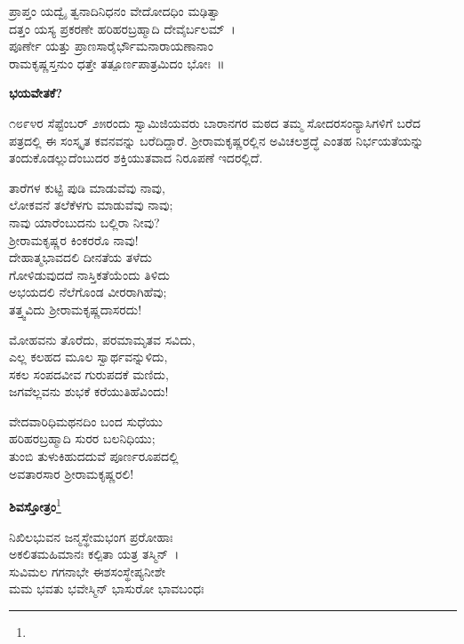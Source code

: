 \begin{myquote}
ಪ್ರಾಪ್ತಂ ಯದ್ವೈ ತ್ವನಾದಿನಿಧನಂ ವೇದೋದಧಿಂ ಮಢಿತ್ವಾ\\ದತ್ತಂ ಯಸ್ಯ ಪ್ರಕರಣೇ ಹರಿಹರಬ್ರಹ್ಮಾದಿ ದೇವೈರ್ಬಲಮ್~।\\
ಪೂರ್ಣೇ ಯತ್ತು ಪ್ರಾಣಸಾರೈರ್ಭೌಮನಾರಾಯಣಾನಾಂ\\ರಾಮಕೃಷ್ಣಸ್ತನುಂ ಧತ್ತೇ ತತ್ಪೂರ್ಣಪಾತ್ರಮಿದಂ ಭೋಃ~॥
\end{myquote}

\begin{center}
\textbf{ಭಯವೇತಕೆ?}
\end{center}

೧೮೯೪ರ ಸೆಪ್ಟೆಂಬರ್ ೨೫ರಂದು ಸ್ವಾಮಿಜಿಯವರು ಬಾರಾನಗರ ಮಠದ ತಮ್ಮ ಸೋದರಸಂನ್ಯಾಸಿಗಳಿಗೆ ಬರೆದ ಪತ್ರದಲ್ಲಿ ಈ ಸಂಸ್ಕೃತ ಕವನವನ್ನು ಬರೆದಿದ್ದಾರೆ. ಶ‍್ರೀರಾಮಕೃಷ್ಣರಲ್ಲಿನ ಅವಿಚಲಶ್ರದ್ಧೆ ಎಂತಹ ನಿರ್ಭಯತೆಯನ್ನು ತಂದುಕೊಡಲ್ಲುದೆಂಬುದರ ಶಕ್ತಿಯುತವಾದ ನಿರೂಪಣೆ ಇದರಲ್ಲಿದೆ.

\begin{myquote}
ತಾರೆಗಳ ಕುಟ್ಟಿ ಪುಡಿ ಮಾಡುವೆವು ನಾವು,\\ಲೋಕವನೆ ತಲೆಕೆಳಗು ಮಾಡುವೆವು ನಾವು;\\ನಾವು ಯಾರೆಂಬುದನು ಬಲ್ಲಿರಾ ನೀವು?\\ಶ‍್ರೀರಾಮಕೃಷ್ಣರ ಕಿಂಕರರೊ ನಾವು!\\ದೇಹಾತ್ಮಭಾವದಲಿ ದೀನತೆಯ ತಳೆದು\\ಗೋಳಿಡುವುದದೆ ನಾಸ್ತಿಕತೆಯೆಂದು ತಿಳಿದು\\ಅಭಯದಲಿ ನೆಲೆಗೊಂಡ ವೀರರಾಗಿಹೆವು;\\ತತ್ತ್ವವಿದು ಶ‍್ರೀರಾಮಕೃಷ್ಣದಾಸರದು!
\end{myquote}

\begin{myquote}
ಮೋಹವನು ತೊರೆದು, ಪರಮಾಮೃತವ ಸವಿದು,\\ಎಲ್ಲ ಕಲಹದ ಮೂಲ ಸ್ವಾರ್ಥವನ್ನುಳಿದು,\\ಸಕಲ ಸಂಪದವೀವ ಗುರುಪದಕೆ ಮಣಿದು,\\ಜಗವೆಲ್ಲವನು ಶುಭಕೆ ಕರೆಯುತಿಹೆವಿಂದು!
\end{myquote}

\begin{myquote}
ವೇದವಾರಿಧಿಮಥನದಿಂ ಬಂದ ಸುಧೆಯು\\ಹರಿಹರಬ್ರಹ್ಮಾದಿ ಸುರರ ಬಲನಿಧಿಯು;\\ತುಂಬಿ ತುಳುಕಿಹುದದುವೆ ಪೂರ್ಣರೂಪದಲ್ಲಿ\\ಅವತಾರಸಾರ ಶ‍್ರೀರಾಮಕೃಷ್ಣರಲಿ!
\end{myquote}

\begin{center}
\textbf{ಶಿವಸ್ತೋತ್ರಂ}\footnote{}
\end{center}

\begin{myquote}
ನಿಖಿಲಭುವನ ಜನ್ಮಸ್ಥೇಮಭಂಗ ಪ್ರರೋಹಾಃ\\ಅಕಲಿತಮಹಿಮಾನಃ ಕಲ್ಪಿತಾ ಯತ್ರ ತಸ್ಮಿನ್~।\\ಸುವಿಮಲ ಗಗನಾಭೇ ಈಶಸಂಸ್ಥೇಪ್ಯನೀಶೇ\\ಮಮ ಭವತು ಭವೇಸ್ಮಿನ್ ಭಾಸುರೋ ಭಾವಬಂಧಃ
\end{myquote}

